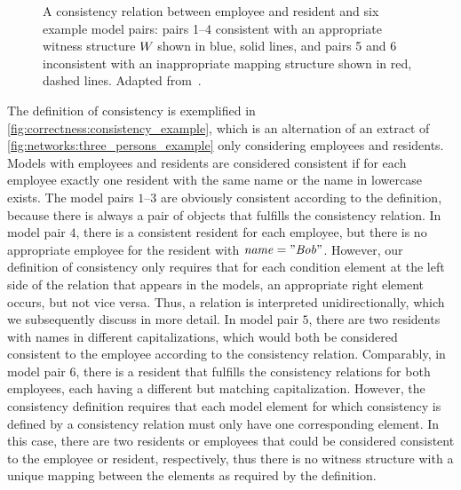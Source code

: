 \begin{figure}
    \centering
    
    \caption[Examples for fine-grained consistency relations]{A consistency relation between employee and resident and six example model pairs: pairs 1--4 consistent with an appropriate witness structure $\consistencyrelation{W}{}$ shown in blue, solid lines, and pairs 5 and 6 inconsistent with an inappropriate mapping structure shown in red, dashed lines. Adapted from~.}
    \label{fig:correctness:consistency_example}
\end{figure}

\begin{example}
The definition of consistency is exemplified in \autoref{fig:correctness:consistency_example}, which is an alternation of an extract of \autoref{fig:networks:three_persons_example} only considering employees and residents. Models with employees and residents are considered consistent if for each employee exactly one resident with the same name or the name in lowercase exists.
The model pairs $1$--$3$ are obviously consistent according to the definition, because there is always a pair of objects that fulfills the consistency relation.
In model pair $4$, there is a consistent resident for each employee, but there is no appropriate employee for the resident with $\mathit{name} = "\mathit{Bob}"$. However, our definition of consistency only requires that for each condition element at the left side of the relation that appears in the models, an appropriate right element occurs, but not vice versa. Thus, a relation is interpreted unidirectionally, which we subsequently discuss in more detail.
In model pair $5$, there are two residents with names in different capitalizations, which would both be considered consistent to the employee according to the consistency relation.
Comparably, in model pair $6$, there is a resident that fulfills the consistency relations for both employees, each having a different but matching capitalization. 
However, the consistency definition requires that each model element for which consistency is defined by a consistency relation must only have one corresponding element. 
In this case, there are two residents or employees that could be considered consistent to the employee or resident, respectively, thus there is no witness structure with a unique mapping between the elements as required by the definition.
\end{example}


